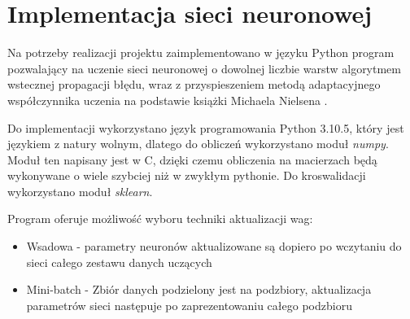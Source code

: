 \documentclass[12pt,twoside]{article}
\begin{document}
\section{Implementacja sieci neuronowej}

Na potrzeby realizacji projektu zaimplementowano w języku Python program pozwalający na uczenie sieci neuronowej o dowolnej liczbie warstw algorytmem wstecznej propagacji błędu, wraz z przyspieszeniem metodą adaptacyjnego współczynnika uczenia na podstawie książki Michaela Nielsena \cite{nielsen}.  

Do implementacji wykorzystano język programowania Python 3.10.5, który jest językiem z natury wolnym, dlatego do obliczeń wykorzystano moduł \textit{numpy}. Moduł ten napisany jest w C, dzięki czemu obliczenia na macierzach będą wykonywane o wiele szybciej niż w zwykłym pythonie. Do kroswalidacji wykorzystano moduł \textit{sklearn}.


Program oferuje możliwość wyboru techniki aktualizacji wag:
\begin{itemize}
\item Wsadowa -  parametry neuronów aktualizowane są dopiero po wczytaniu do sieci całego zestawu danych uczących
\item Mini-batch -  Zbiór danych podzielony jest na podzbiory, aktualizacja parametrów sieci następuje po zaprezentowaniu całego podzbioru

\end{itemize}
\end{document}
